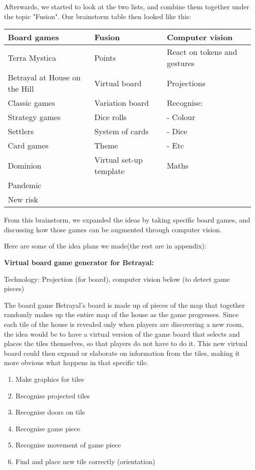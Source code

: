 Afterwards, we started to look at the two lists, and combine them together under the topic "Fusion". Our brainstorm table then looked like this:

\begin{tabular}{l | l | l}
Board games & Fusion & Computer vision\\
\hline
Terra Mystica & Points & React on tokens and gestures\\
Betrayal at House on the Hill &  Virtual board & Projections\\
Classic games & Variation board & Recognise: \\
Strategy games & Dice rolls & - Colour\\
Settlers & System of cards & - Dice\\
Card games & Theme & - Etc\\
Dominion & Virtual set-up template & Maths\\
Pandemic \\
New risk\\
\end{tabular}

From this brainstorm, we expanded the ideas by taking specific board games, and discussing how those games can be augmented through computer vision.


Here are some of the idea plans we made(the rest are in appendix):

\textbf{Virtual board game generator for Betrayal:} 

Technology: Projection (for board), computer vision below (to detect game pieces)

The board game Betrayal’s board is made up of pieces of the map that together randomly makes up the entire map of the house as the game progresses. Since each tile of the house is revealed only when players are discovering a new room, the idea would be to have a virtual version of the game board that selects and places the tiles themselves, so that players do not have to do it. This new virtual board could then expand or elaborate on information from the tiles, making it more obvious what happens in that specific tile.
\begin{enumerate}
\item Make graphics for tiles
\item Recognise projected tiles
\item Recognise doors on tile
\item Recognise game piece
\item Recognise movement of game piece
\item Find and place new tile correctly (orientation)
\end{enumerate}


